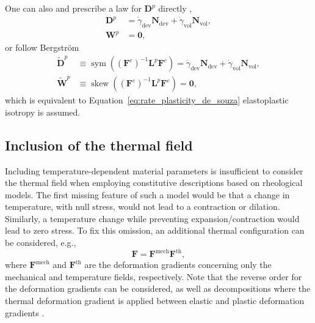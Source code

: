 One can also and prescribe a law for $\bm D^p$ directly \citep{boyceLargeInelasticDeformation1988},
\begin{align}
\label{eq:d_w_directly}
	\bm D^p & = \dot\gamma_\text{dev} \bm N_\text{dev} + \dot\gamma_\text{vol} \bm N_\text{vol},\\
	\bm W^p & = \bm 0,
\end{align}
or follow Bergström \citep{bergstromMechanicsSolidPolymers2015}
\begin{align}
	\label{eq:d_w_bergstrom}
	\tilde{\bm D}^p &\equiv \operatorname{sym}((\bm F^e)^{-1}\bm L^p \bm F^e) = \dot\gamma_\text{dev} \bm N_\text{dev} + \dot\gamma_\text{vol} \bm N_\text{vol},\\
	\tilde{\bm W}^p &\equiv \operatorname{skew}( (\bm F^e)^{-1}\bm L^p \bm F^e) = \bm 0,
\end{align}
which is equivalent to Equation~\eqref{eq:rate_plasticity_de_souza} elastoplastic isotropy \citep{desouzanetoComputationalMethodsPlasticity2008} is assumed.

\subsection{Inclusion of the thermal field}
\label{sec:inclusion_thermal_field}

Including temperature-dependent material parameters is insufficient to consider the thermal field when employing constitutive descriptions based on rheological models.
The first missing feature of such a model would be that a change in temperature, with null stress, would not lead to a contraction or dilation.
Similarly, a temperature change while preventing expansion/contraction would lead to zero stress.
To fix this omission, an additional thermal configuration can be considered, e.g.,
\begin{equation}
	\bm F = \bm F^\text{mech}\bm F^\text{th},
\end{equation}
where $\bm F^\text{mech}$ and $\bm F^\text{th}$ are the deformation gradients concerning only the mechanical and temperature fields, respectively.
Note that the reverse order for the deformation gradients can be considered, as well as decompositions where the thermal deformation gradient is applied between elastic and plastic deformation gradients \citep{arrudaEffectsStrainRate1995}.

